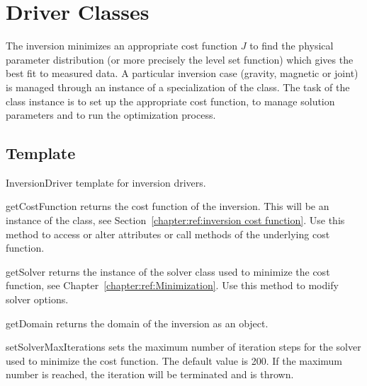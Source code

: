 \section{Driver Classes}
The inversion minimizes an appropriate cost function $J$ to find the physical parameter distribution 
(or more precisely the level set function) which gives the best fit to measured data. A 
particular inversion case (gravity, magnetic or joint) is managed through 
an instance of a specialization of the  class. The task of the class instance
is to set up the appropriate cost function, to manage solution parameters and to run the optimization process.

\subsection{Template}
\begin{classdesc*}{InversionDriver}
template for inversion drivers. 
\end{classdesc*}
 
\begin{methoddesc}[InversionDriver]{getCostFunction}{}
returns the cost function of the inversion. This will be an instance of the  class, see Section~\ref{chapter:ref:inversion cost function}.
Use this method to access or alter attributes or call methods of the underlying cost function.
\end{methoddesc}

\begin{methoddesc}[InversionDriver]{getSolver}{}
returns the instance of the solver class used to minimize the cost function, see Chapter~\ref{chapter:ref:Minimization}. 
Use this method to modify solver options.
\end{methoddesc}

\begin{methoddesc}[InversionDriver]{getDomain}{}
returns the domain of the inversion as an \escript {} object.
\end{methoddesc}

        
\begin{methoddesc}[InversionDriver]{setSolverMaxIterations}{}
sets the maximum number of iteration steps for the solver used to minimize the cost function. The default value is 200.
If the maximum number is reached, the iteration will be terminated and  is thrown.
\end{methoddesc}

